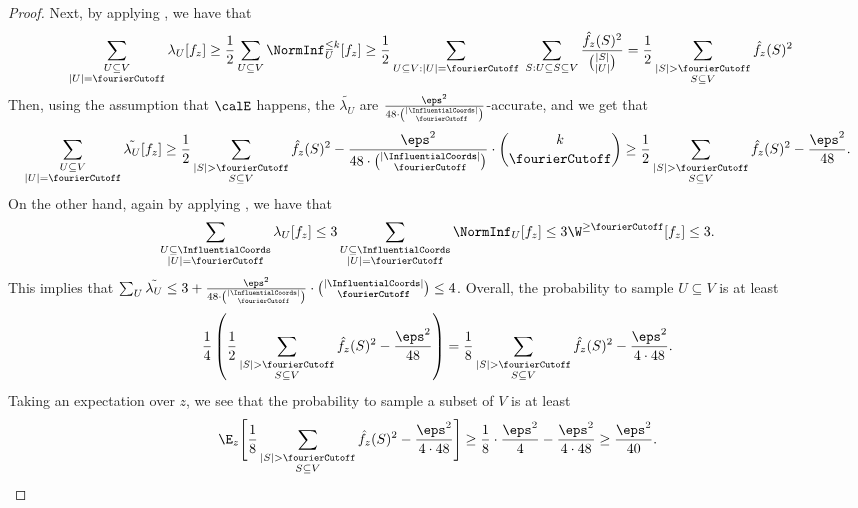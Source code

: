 \begin{proof}
Next, by applying , we have that
\begin{align*}\sum_{\substack{U \subseteq V\\|U| = \fourierCutoff}}\lambda_U[f_z] &\geq \frac{1}{2}\sum_{U \subseteq V} \NormInf_U^{\leq k}[f_z] 
 \ge \frac{1}{2} \sum_{U \subseteq V:|U|=\fourierCutoff} \;\sum_{S: U \subseteq S \subseteq V} \frac{\hat{f_z}(S)^2}{\binom{|S|}{|U|}} = \frac{1}{2}\sum_{\substack{|S|>\fourierCutoff\\ S\subseteq V}}\hat{f_z}(S)^2
\end{align*}
Then, using the assumption that $\calE$ happens, the $\tilde{\lambda_U}$ are $\frac{\eps^2}{48\cdot\binom{|\InfluentialCoords|}{\fourierCutoff}}$-accurate, and we get that
$$\sum_{\substack{U \subseteq V\\|U| = \fourierCutoff}}\Tilde{\lambda_U}[f_z] \geq \frac{1}{2}\sum_{\substack{|S|>\fourierCutoff\\ S\subseteq V}}\hat{f_z}(S)^2 - \frac{\eps^2}{48\cdot\binom{|\InfluentialCoords|}{\fourierCutoff}}\cdot \binom{k}{\fourierCutoff} \geq \frac{1}{2}\sum_{\substack{|S|>\fourierCutoff\\ S\subseteq V}}\hat{f_z}(S)^2 - \frac{\eps^2}{48}.$$
On the other hand, again by applying , we have that
$$\sum_{\substack{U \subseteq\InfluentialCoords \\|U| = \fourierCutoff}}\lambda_U[f_z] \leq 3\sum_{\substack{U \subseteq\InfluentialCoords \\|U| = \fourierCutoff}}\NormInf_U[f_z] \leq 3\W^{\geq \fourierCutoff}[f_z] \leq 3. $$
This implies that $\sum_U \tilde{\lambda_U} \leq 3 + \frac{\eps^2}{48\cdot\binom{|\InfluentialCoords|}{\fourierCutoff}}\cdot \binom{|\InfluentialCoords|}{\fourierCutoff} \leq 4$. Overall, the probability to sample $U\subseteq V$ is at least 
$$\frac{1}{4}\left(\frac{1}{2}\sum_{\substack{|S|>\fourierCutoff\\ S\subseteq V}}\hat{f_z}(S)^2 - \frac{\eps^2}{48} \right ) = \frac{1}{8} \sum_{\substack{|S|>\fourierCutoff\\ S\subseteq V}}\hat{f_z}(S)^2 - \frac{\eps^2}{4\cdot48}.$$
Taking an expectation over $z$, we see that the probability to sample a subset of $V$ is at least 
\[\E_z \Bigg [\frac{1}{8} \sum_{\substack{|S|>\fourierCutoff\\ S\subseteq V}}\hat{f_z}(S)^2 - \frac{\eps^2}{4\cdot48}\Bigg ]\geq \frac{1}{8} \cdot \frac{\eps^2}{4} - \frac{\eps^2}{4\cdot 48} \geq \frac{\eps^2}{40}. \qedhere\]
\end{proof}




